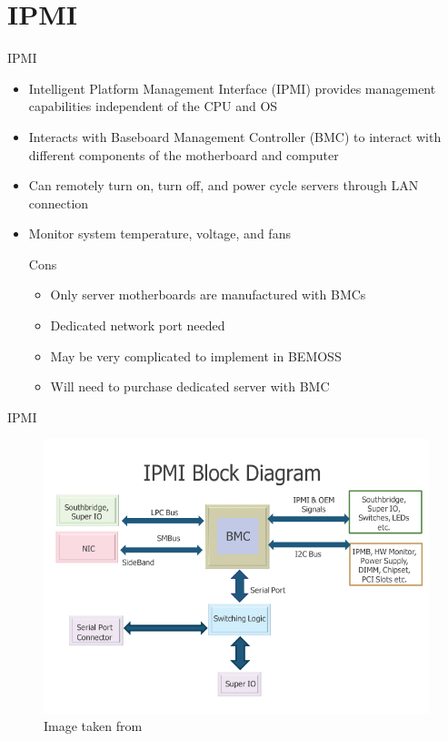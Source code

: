 \documentclass{beamer}
\begin{document}
\section{IPMI}
\begin{frame}{IPMI}
\begin{itemize}
\item Intelligent Platform Management Interface (IPMI) provides management capabilities independent of the CPU and OS
\item Interacts with Baseboard Management Controller (BMC) to interact with different components of the motherboard and computer
\item Can remotely turn on, turn off, and power cycle servers through LAN connection
\item Monitor system temperature, voltage, and fans 	
\begin{block}{Cons}
\begin{itemize}
\item Only server motherboards are manufactured with BMCs
\item Dedicated network port needed
\item May be very complicated to implement in BEMOSS
\item Will need to purchase dedicated server with BMC
\end{itemize}
\end{block}
\end{itemize}
\end{frame}

\begin{frame}{IPMI}
\begin{figure}
\includegraphics[scale=0.35]{figs/ipmiBlockDiagram}
\caption{Image taken from \cite{IPMI}}
\end{figure}
\end{frame}
\end{document}
